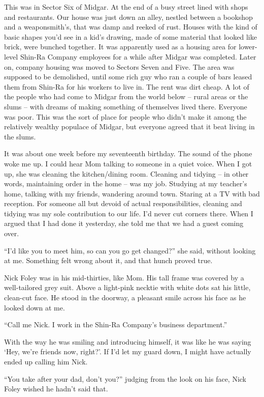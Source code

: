 \documentclass[oneside]{book}
\begin{document}
This was in Sector Six of Midgar. At the end of a busy street lined with shops and restaurants. Our house was just down an alley, nestled between a bookshop and a weaponsmith’s, that was damp and reeked of rust. Houses with the kind of basic shapes you’d see in a kid’s drawing, made of some material that looked like brick, were bunched together. It was apparently used as a housing area for lower-level Shin-Ra Company employees for a while after Midgar was completed. Later on, company housing was moved to Sectors Seven and Five. The area was supposed to be demolished, until some rich guy who ran a couple of bars leased them from Shin-Ra for his workers to live in. The rent was dirt cheap. A lot of the people who had come to Midgar from the world below – rural areas or the slums – with dreams of making something of themselves lived there. Everyone was poor. This was the sort of place for people who didn’t make it among the relatively wealthy populace of Midgar, but everyone agreed that it beat living in the slums.

It was about one week before my seventeenth birthday. The sound of the phone woke me up. I could hear Mom talking to someone in a quiet voice. When I got up, she was cleaning the kitchen/dining room. Cleaning and tidying – in other words, maintaining order in the home – was my job. Studying at my teacher’s home, talking with my friends, wandering around town. Staring at a TV with bad reception. For someone all but devoid of actual responsibilities, cleaning and tidying was my sole contribution to our life. I’d never cut corners there. When I argued that I had done it yesterday, she told me that we had a guest coming over.

“I’d like you to meet him, so can you go get changed?” she said, without looking at me. Something felt wrong about it, and that hunch proved true.

Nick Foley was in his mid-thirties, like Mom. His tall frame was covered by a well-tailored grey suit. Above a light-pink necktie with white dots sat his little, clean-cut face. He stood in the doorway, a pleasant smile across his face as he looked down at me.

“Call me Nick. I work in the Shin-Ra Company’s business department.”

With the way he was smiling and introducing himself, it was like he was saying ‘Hey, we’re friends now, right?’. If I’d let my guard down, I might have actually ended up calling him Nick.

“You take after your dad, don’t you?” judging from the look on his face, Nick Foley wished he hadn’t said that.
\end{document}
